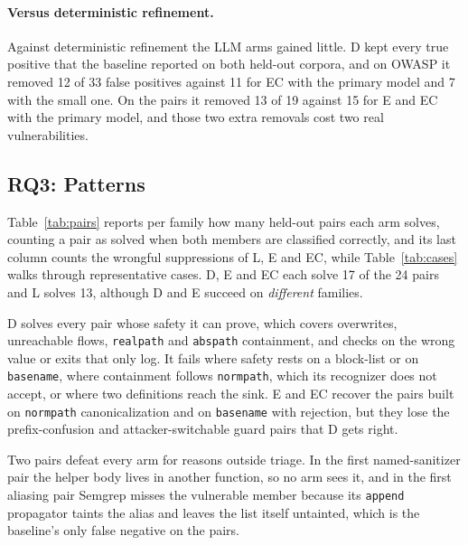 \paragraph{Versus deterministic refinement.}
Against deterministic refinement the LLM arms gained little. D kept every true positive that the baseline reported on both held-out corpora, and on OWASP it removed 12 of 33 false positives against 11 for EC with the primary model and 7 with the small one. On the pairs it removed 13 of 19 against 15 for E and EC with the primary model, and those two extra removals cost two real vulnerabilities.

\begin{table}[t]
\caption{E's suppressions under the EC gate.}
\label{tab:gate}
\resizebox{\columnwidth}{!}{}
\end{table}

\subsection{RQ3: Patterns}
Table~\ref{tab:pairs} reports per family how many held-out pairs each arm solves, counting a pair as solved when both members are classified correctly, and its last column counts the wrongful suppressions of L, E and EC, while Table~\ref{tab:cases} walks through representative cases. D, E and EC each solve 17 of the 24 pairs and L solves 13, although D and E succeed on \emph{different} families.

D solves every pair whose safety it can prove, which covers overwrites, unreachable flows, \texttt{realpath} and \texttt{abspath} containment, and checks on the wrong value or exits that only log. It fails where safety rests on a block-list or on \texttt{basename}, where containment follows \texttt{normpath}, which its recognizer does not accept, or where two definitions reach the sink. E and EC recover the pairs built on \texttt{normpath} canonicalization and on \texttt{basename} with rejection, but they lose the prefix-confusion and attacker-switchable guard pairs that D gets right.

Two pairs defeat every arm for reasons outside triage. In the first named-sanitizer pair the helper body lives in another function, so no arm sees it, and in the first aliasing pair Semgrep misses the vulnerable member because its \texttt{append} propagator taints the alias and leaves the list itself untainted, which is the baseline's only false negative on the pairs.

\begin{table}[t]
\caption{Held-out diagnostic pair accuracy and wrongful suppressions.}
\label{tab:pairs}
\resizebox{\columnwidth}{!}{}
\end{table}

